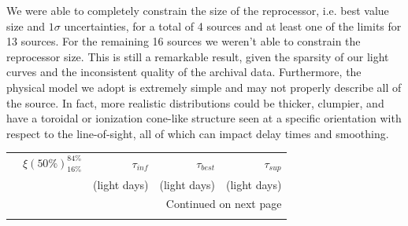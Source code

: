 We were able to completely constrain the size of the reprocessor, i.e. best value size and $1\sigma$ uncertainties, for a total of 4 sources and at least one of the limits for 13 sources. For the remaining 16 sources we weren't able to constrain the reprocessor size. This is still a remarkable result, given the sparsity of our light curves and the inconsistent quality of the archival data. Furthermore, the physical model we adopt is extremely simple and may not properly describe all of the source. In fact, more realistic distributions could be thicker, clumpier, and have a toroidal or ionization cone-like structure seen at a specific orientation with respect to the line-of-sight, all of which can impact delay times and smoothing.

\begin{longtable}{llrrr}
\label{tab:taus}\\
\toprule
{} & $\xi(50\%)_{16\%}^{84\%}$   & $\tau_{inf}$ & $\tau_{best}$ & $\tau_{sup}$ \\
{} &                           & (light days) &  (light days) & (light days) \\
\midrule
\endhead
\midrule
\multicolumn{5}{r}{{Continued on next page}} \\
\midrule
\endfoot


\end{longtable}
